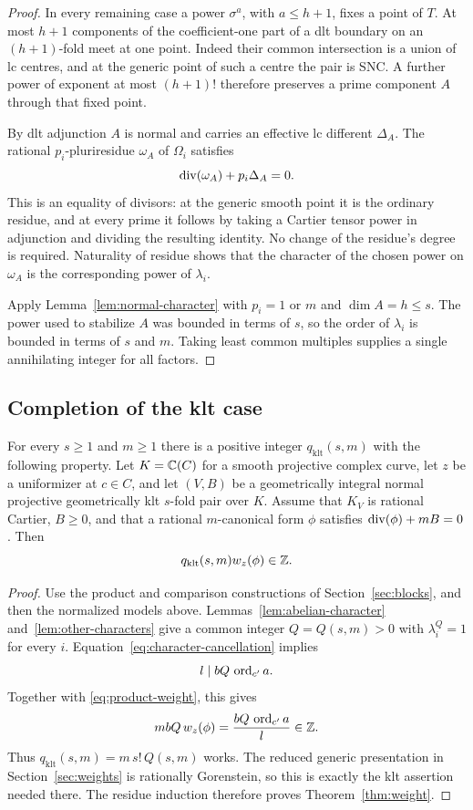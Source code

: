 \begin{proof}
In every remaining case a power $\sigma^a$, with $a\leq h+1$, fixes
a point of $T$. At most $h+1$ components of the coefficient-one part
of a dlt boundary on an $(h+1)$-fold meet at one point.
Indeed their common intersection
is a union of lc centres, and at the generic point of such a centre
the pair is SNC. A further power of exponent at most $(h+1)!$
therefore preserves a prime component $A$ through that fixed point.

By dlt adjunction $A$ is normal and carries an effective lc different
$\Delta_A$. The rational $p_i$-pluriresidue $\omega_A$ of $\Omega_i$
satisfies
\[
                      \operatorname{div}(\omega_A)+p_i\Delta_A=0.
\]
This is an equality of divisors: at the generic smooth point it is
the ordinary residue, and at every prime it follows by taking a
Cartier tensor power in adjunction and dividing the resulting
identity. No change of the residue's degree is required.
Naturality of residue shows that the character of the chosen power
on $\omega_A$ is the corresponding power of $\lambda_i$.

Apply Lemma~\ref{lem:normal-character} with $p_i=1$ or $m$ and
$\dim A=h\leq s$. The power used to stabilize $A$ was bounded in
terms of $s$, so the order of $\lambda_i$ is bounded in terms
of $s$ and $m$. Taking least common multiples supplies a single
annihilating integer for all factors.
\end{proof}

\subsection{Completion of the klt case}

\begin{proposition}\label{prop:klt-weight}
For every $s\geq1$ and $m\geq1$ there is a positive integer
$q_{\mathrm{klt}}(s,m)$ with the following property.
Let $K=\mathbb C(C)$ for a smooth projective complex curve, let $z$ be a
uniformizer at $c\in C$, and let $(V,B)$ be a geometrically integral
normal projective geometrically klt $s$-fold pair over $K$.
Assume that $K_V$ is rational Cartier, $B\geq0$, and that a rational
$m$-canonical form $\phi$ satisfies $\operatorname{div}(\phi)+mB=0$.
Then
\[
                         q_{\mathrm{klt}}(s,m)w_z(\phi)\in\mathbb Z.
\]
\end{proposition}

\begin{proof}
Use the product and comparison constructions of
Section~\ref{sec:blocks}, and then the normalized models above.
Lemmas~\ref{lem:abelian-character} and~\ref{lem:other-characters}
give a common integer $Q=Q(s,m)>0$ with $\lambda_i^Q=1$ for every $i$.
Equation~\eqref{eq:character-cancellation} implies
\[
                              l\mid bQ\,\operatorname{ord}_{c'}a .
\]
Together with \eqref{eq:product-weight}, this gives
\[
                 mbQ\,w_z(\phi)=\frac{bQ\,\operatorname{ord}_{c'}a}{l}\in\mathbb Z.
\]
Thus $q_{\mathrm{klt}}(s,m)=m\,s!\,Q(s,m)$ works.
The reduced generic presentation in Section~\ref{sec:weights}
is rationally Gorenstein, so this is exactly the klt assertion
needed there. The residue induction therefore proves
Theorem~\ref{thm:weight}.
\end{proof}
